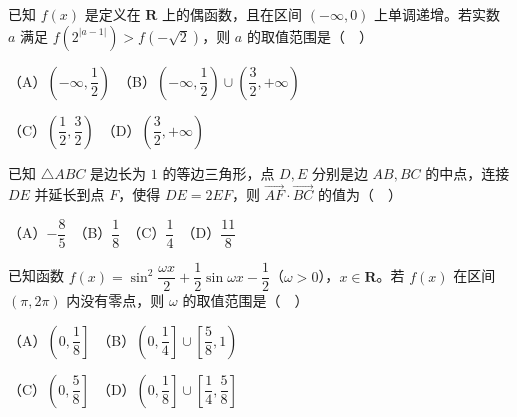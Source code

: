 \begin{question}
已知 \(f(x)\) 是定义在 \(\mathbf{R}\) 上的偶函数，且在区间 \((-\infty,0)\) 上单调递增。若实数 \(a\) 满足 \(f\left(2^{|a-1|}\right)>f\left(-\sqrt{2}\right)\)，则 \(a\) 的取值范围是（　）

（A）\(\left(-\infty,\dfrac{1}{2}\right)\)　（B）\(\left(-\infty,\dfrac{1}{2}\right)\cup\left(\dfrac{3}{2},+\infty\right)\)

（C）\(\left(\dfrac{1}{2},\dfrac{3}{2}\right)\)　（D）\(\left(\dfrac{3}{2},+\infty\right)\)

\end{question}
\begin{question}
已知 \(\triangle ABC\) 是边长为 \(1\) 的等边三角形，点 \(D,E\) 分别是边 \(AB,BC\) 的中点，连接 \(DE\) 并延长到点 \(F\)，使得 \(DE=2EF\)，则 \(\overrightarrow{AF}\cdot\overrightarrow{BC}\) 的值为（　）

（A）\(-\dfrac{8}{5}\)　（B）\(\dfrac{1}{8}\)　（C）\(\dfrac{1}{4}\)　（D）\(\dfrac{11}{8}\)

\end{question}
\begin{question}
已知函数 \(f(x)=\sin^{2}\dfrac{\omega x}{2}+\dfrac{1}{2}\sin\omega x-\dfrac{1}{2}\)（\(\omega>0\)），\(x\in\mathbf{R}\)。若 \(f(x)\) 在区间 \((\pi,2\pi)\) 内没有零点，则 \(\omega\) 的取值范围是（　）

（A）\(\left(0,\dfrac{1}{8}\right]\)　（B）\(\left(0,\dfrac{1}{4}\right]\cup\left[\dfrac{5}{8},1\right)\)

（C）\(\left(0,\dfrac{5}{8}\right]\)　（D）\(\left(0,\dfrac{1}{8}\right]\cup\left[\dfrac{1}{4},\dfrac{5}{8}\right]\)

\end{question}


